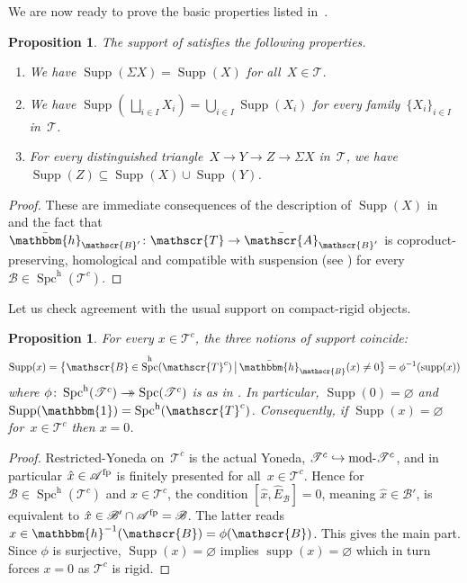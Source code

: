 \documentclass[JEP,XML,SOM,Unicode]{cedram}
\newenvironment{enumeratea}
{\bgroup\def\theenumi{\alph{enumi}}\begin{enumerate}}
{\end{enumerate}\egroup}
\def\hto{\mathrel{\lhook\joinrel\to}}
\newcommand{\onto}{\mathchoice{\to\hspace*{-5mm}\to}{\to\hspace*{-2.85mm}\to}{\to\hspace*{-3mm}\to}{\to\hspace*{-3mm}\to}}
\numberwithin{equation}{section}
\newtheorem{Prop}[equation]{Proposition}
\theoremstyle{definition}
\DeclareMathOperator{\supp}{supp}
\DeclareMathOperator{\Spc}{Spc}
\newcommand{\cat}[1]{\mathscr{#1}}
\newcommand{\inv}{^{-1}}
\newcommand{\SET}[2]{\big\{#1\,\big|\,#2\big\}}
\newcommand{\unit}{\mathbbm{1}}
\DeclareMathOperator{\modname}{mod}
\newcommand{\smallh}{\mathrm{h}}
\DeclareMathOperator{\Supp}{Supp}
\newcommand{\ABp}{\bar{\cA}_{\cB'}}
\newcommand{\boneda}{\bar\yoneda}
\newcommand{\cA}{\cat{A}}
\newcommand{\cB}{\cat{B}}
\newcommand{\cT}{\cat{T}}
\newcommand{\fp}{^{\textup{fp}}}
\newcommand{\hBp}{\boneda_{\cB'}}
\newcommand{\hB}{\boneda_{\cB}}
\newcommand{\hEB}{\hat E_{\cB}}
\let\hook\hto
\newcommand{\modd}{\modname\text{\!-}}
\newcommand{\mT}{\modd\cat T^c}
\newcommand{\SpchT}{\Spch(\cat{T}^c)}
\newcommand{\Spch}{\Spc^{\smallh}}
\newcommand{\SpcT}{\Spc(\cat{T}^c)}
\newcommand{\yoneda}{\mathbbm{h}}
\begin{document}
We are now ready to prove the basic properties listed in~.

\begin{Prop}
\label{Prop:support}
The support of  satisfies the following properties.
\begin{enumeratea}
\item
\label{it:Supp-sigma}
We have $\Supp(\Sigma X)=\Supp(X)$ for all~$X\in\cat{T}$.

\item
\label{it:Supp-coprod}
We have $\Supp(\,\bigsqcup_{i\in I} X_i)=\bigcup_{i\in I}\Supp(X_i)$ for every family~$\{X_i\}_{i\in I}$ in~$\cat{T}$.

\item
\label{it:Supp-triangle}
For every distinguished triangle~$X\to Y\to Z\to \Sigma X$ in~$\cat{T}$, we have $\Supp(Z)\subseteq\Supp(X)\cup\Supp(Y)$.
\end{enumeratea}
\end{Prop}

\begin{proof}
These are immediate consequences of the description of $\Supp(X)$ in  and the fact that $\hBp\colon \cT\to \ABp$ is coproduct-preserving, homological and compatible with suspension (see ) for every $\cB\in\SpchT$.
\end{proof}

Let us check agreement with the usual support on compact-rigid objects.

\begin{Prop}
\label{Prop:agree}
For every $x\in\cT^c$, the three notions of support coincide:
\[
\Supp(x)=\SET{\cB\in\SpchT}{\hB(x)\neq 0}=\phi\inv(\supp(x))
\]
where $\phi\colon \SpchT\onto \SpcT$ is as in . In particular, $\Supp(0)=\varnothing$ and $\Supp(\unit)=\SpchT$. Consequently, if $\Supp(x)=\varnothing$ for~$x\in\cT^c$ then $x=0$.
\end{Prop}

\begin{proof}
Restricted-Yoneda on~$\cT^c$ is the actual Yoneda, $\cT^c\hook\mT$, and in particular $\hat x\in\cA\fp$ is finitely presented for all~$x\in\cT^c$. Hence for $\cB\in\SpchT$ and $x\in\cT^c$, the condition $[\hat x,\hEB]=0$, meaning $\hat x\in\cB'$, is equivalent to $\hat x\in\cB'\cap \cA\fp=\cB$. The latter reads $x\in\yoneda\inv(\cB)=\phi(\cB)$. This gives the main part. Since $\phi$ is surjective, $\Supp(x)=\varnothing$ implies $\supp(x)=\varnothing$ which in turn forces $x=0$ as $\cT^c$ is rigid.
\end{proof}
\end{document}

